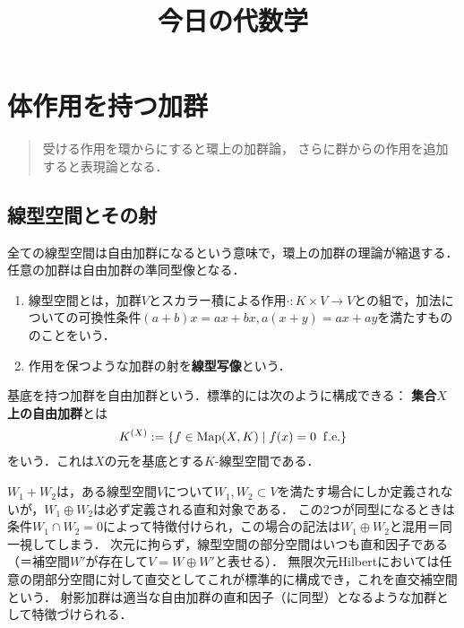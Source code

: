 \documentclass[uplatex,dvipdfmx]{jsreport}
\title{今日の代数学}
\author{}
\begin{document}
\tableofcontents

\chapter{体作用を持つ加群}

\begin{quotation}
    受ける作用を環からにすると環上の加群論，
    さらに群からの作用を追加すると表現論となる．
\end{quotation}

\section{線型空間とその射}

\begin{tcolorbox}[colframe=ForestGreen, colback=ForestGreen!10!white,breakable,colbacktitle=ForestGreen!40!white,coltitle=black,fonttitle=\bfseries\sffamily,
title=]
    全ての線型空間は自由加群になるという意味で，環上の加群の理論が縮退する．
    任意の加群は自由加群の準同型像となる．
\end{tcolorbox}

\begin{definition}\mbox{}
    \begin{enumerate}
        \item 線型空間とは，加群$V$とスカラー積による作用$\cdot:K\times V\to V$との組で，加法についての可換性条件$(a+b)x=ax+bx,a(x+y)=ax+ay$を満たすもののことをいう．
        \item 作用を保つような加群の射を\textbf{線型写像}という．
    \end{enumerate}
\end{definition}

\begin{example}
    基底を持つ加群を自由加群という．標準的には次のように構成できる：
    \textbf{集合$X$上の自由加群}とは
    \[K^{(X)}:=\left\{f\in\mathrm{Map}(X,K)\mid f(x)=0\;\;\mathrm{f.e.}\right\}\]
    をいう．これは$X$の元を基底とする$K$-線型空間である．
\end{example}

\begin{remarks}[直和について]
    $W_1+W_2$は，ある線型空間$V$について$W_1,W_2\subset V$を満たす場合にしか定義されないが，$W_1\oplus W_2$は必ず定義される直和対象である．
    この2つが同型になるときは条件$W_1\cap W_2=0$によって特徴付けられ，この場合の記法は$W_1\oplus W_2$と混用＝同一視してしまう．
    次元に拘らず，線型空間の部分空間はいつも直和因子である（＝補空間$W'$が存在して$V=W\oplus W'$と表せる）．
    無限次元Hilbertにおいては任意の閉部分空間に対して直交としてこれが標準的に構成でき，これを直交補空間という．
    射影加群は適当な自由加群の直和因子（に同型）となるような加群として特徴づけられる．
\end{remarks}
\end{document}
